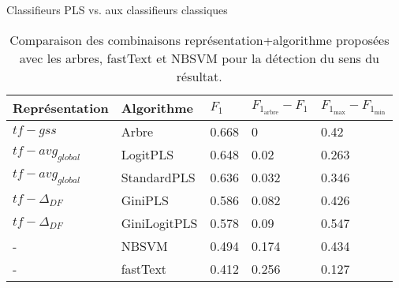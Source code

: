 \begin{frame}[t]{\mysubsectiontitle}
	Classifieurs PLS vs. aux classifieurs classiques
\begin{table}[!htb]	
	\scriptsize
	\centering
	\begin{tabular}{|l|l|l|l|l|}
		\hline
		\textbf{Représentation} & \textbf{Algorithme} & \textbf{$F_{1}$} & $F_{1_\text{arbre}} - F_1$ & \textbf{$F_{1_\text{max}} - F_{1_\text{min}}$} \\ \hline
		
		$tf-gss$ & Arbre & 0.668 & 0 & 0.42\\ \hline
		$tf - avg_{global}$ & LogitPLS & 0.648 & 0.02 & 0.263  \\ \hline
		$tf - avg_{global}$ & StandardPLS & 0.636 & 0.032 & 0.346 \\ \hline
		$tf - \Delta_{DF}$ & GiniPLS & 0.586 & 0.082 & 0.426 \\ \hline
		$tf - \Delta_{DF}$ & GiniLogitPLS & 0.578 & 0.09 & 0.547 \\ \hline
		- & NBSVM & 0.494 & 0.174 & 0.434  \\ \hline
		- & fastText & 0.412 & 0.256 & 0.127 \\ \hline
	\end{tabular}
	\caption{Comparaison des combinaisons représentation+algorithme proposées avec les arbres, fastText et NBSVM pour la détection du sens du résultat.}\label{tab:sensrst:global}
\end{table}

\end{frame}

